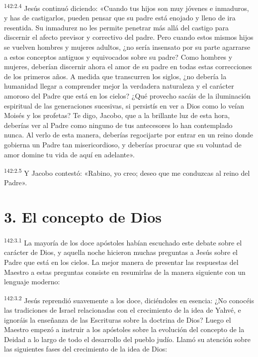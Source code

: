 \par 
\textsuperscript{142:2.4} Jesús continuó diciendo: «Cuando tus hijos son muy jóvenes e inmaduros, y has de castigarlos, pueden pensar que su padre está enojado y lleno de ira resentida. Su inmadurez no les permite penetrar más allá del castigo para discernir el afecto previsor y correctivo del padre. Pero cuando estos mismos hijos se vuelven hombres y mujeres adultos, ¿no sería insensato por su parte agarrarse a estos conceptos antiguos y equivocados sobre su padre? Como hombres y mujeres, deberían discernir ahora el amor de su padre en todas estas correcciones de los primeros años. A medida que transcurren los siglos, ¿no debería la humanidad llegar a comprender mejor la verdadera naturaleza y el carácter amoroso del Padre que está en los cielos? ¿Qué provecho sacáis de la iluminación espiritual de las generaciones sucesivas, si persistís en ver a Dios como lo veían Moisés y los profetas? Te digo, Jacobo, que a la brillante luz de esta hora, deberías ver al Padre como ninguno de tus antecesores lo han contemplado nunca. Al verlo de esta manera, deberías regocijarte por entrar en un reino donde gobierna un Padre tan misericordioso, y deberías procurar que su voluntad de amor domine tu vida de aquí en adelante».

\par 
\textsuperscript{142:2.5} Y Jacobo contestó: «Rabino, yo creo; deseo que me conduzcas al reino del Padre».

\section*{3. El concepto de Dios}
\par 
\textsuperscript{142:3.1} La mayoría de los doce apóstoles habían escuchado este debate sobre el carácter de Dios, y aquella noche hicieron muchas preguntas a Jesús sobre el Padre que está en los cielos. La mejor manera de presentar las respuestas del Maestro a estas preguntas consiste en resumirlas de la manera siguiente con un lenguaje moderno:

\par 
\textsuperscript{142:3.2} Jesús reprendió suavemente a los doce, diciéndoles en esencia: ¿No conocéis las tradiciones de Israel relacionadas con el crecimiento de la idea de Yahvé, e ignoráis la enseñanza de las Escrituras sobre la doctrina de Dios? Luego el Maestro empezó a instruir a los apóstoles sobre la evolución del concepto de la Deidad a lo largo de todo el desarrollo del pueblo judío. Llamó su atención sobre las siguientes fases del crecimiento de la idea de Dios:

